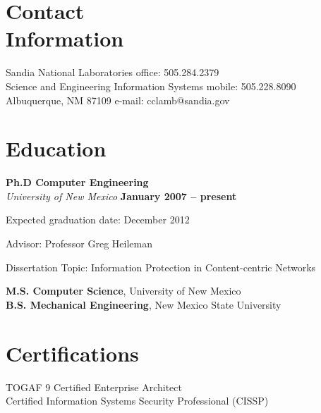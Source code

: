 \documentclass[margin,line]{resume}
\begin{document}
\begin{resume}

\section{\mysidestyle Contact\\Information}
Sandia National Laboratories					\hfill office: 505.284.2379				\vspace{0mm}\\\vspace{0mm}%
Science and Engineering Information Systems	\hfill mobile: 505.228.8090      		\vspace{0mm}\\\vspace{0mm}%
Albuquerque, NM 87109						\hfill e-mail: cclamb@sandia.gov		  	\vspace{0mm}\\\vspace{-4.5mm}%

\section{\mysidestyle Education}

\textbf{Ph.D Computer Engineering} \\
\textsl{University of New Mexico} \hfill \textbf{ January 2007 -- present}
\begin{list2}\vspace{2mm}
\item Expected graduation date: December 2012
\item Advisor:  Professor Greg Heileman
\item Dissertation Topic: Information Protection in Content-centric Networks
\end{list2}%
{\bf M.S. Computer Science}, University of New Mexico \\ %
{\bf B.S. Mechanical Engineering}, New Mexico State University %

\section{\mysidestyle Certifications}
TOGAF 9 Certified Enterprise Architect \\
Certified Information Systems Security Professional (CISSP)


\end{resume}
\end{document}
